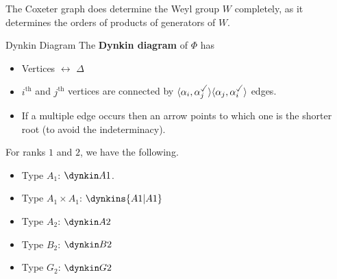 \documentclass{article}
\begin{document}
\begin{remark*}
    The Coxeter graph does determine the Weyl group $W$ completely, as it determines the orders of products of generators of $W$.
\end{remark*}
\begin{fancydefine*}{Dynkin Diagram}
    The \textbf{Dynkin diagram} of $\Phi$ has \begin{itemize}
        \item Vertices $\leftrightarrow$ $\Delta$
        \item $i^{\text{th}}$ and $j^{\text{th}}$ vertices are connected by $\langle \alpha_{i}, \alpha_{j}^{\checked} \rangle \langle \alpha_{j},\alpha_{i}^{\checked} \rangle$ edges.
        \item If a multiple edge occurs then an arrow points to which one is the shorter root (to avoid the indeterminacy).
    \end{itemize}
\end{fancydefine*}
\begin{exs}
    For ranks $1$ and $2$, we have the following. \begin{itemize}
    \item Type $A_{1}$: $\dynkin A1$.
    \item Type $A_{1}\times A_{1}$: $\dynkins{A1|A1}$
    \item Type $A_{2}$: $\dynkin A2$
    \item Type $B_{2}$: $\dynkin B2$
    \item Type $G_{2}$: $\dynkin G2$
    \end{itemize}
\end{exs}




\newlec 
\end{document}
